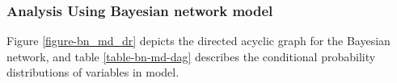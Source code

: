 \documentclass[review]{elsarticle}
\begin{document}
%
%



\subsubsection{Analysis Using Bayesian network model}
\label{section-bayesian-network-model}

Figure \ref{figure-bn_md_dr} depicts the directed acyclic graph for the Bayesian network, and table \ref{table-bn-md-dag} describes the conditional probability distributions of variables in model.
\end{document}
